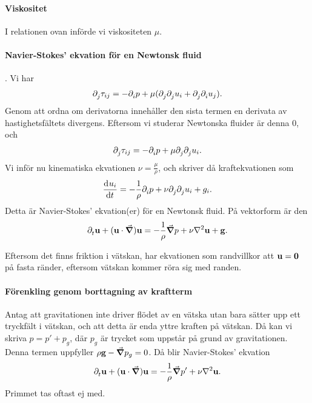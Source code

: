\paragraph{Viskositet}
I relationen ovan införde vi viskositeten $\mu$.

\paragraph{Navier-Stokes' ekvation för en Newtonsk fluid}.
Vi har
\begin{align*}
	\partial_{j}^{}\tau_{ij} = -\partial_{i}^{}p + \mu(\partial_{j}^{}\partial_{j}^{}u_{i} + \partial_{j}^{}\partial_{i}^{}u_{j}).
\end{align*}
Genom att ordna om derivatorna innehåller den sista termen en derivata av hastighetsfältets divergens. Eftersom vi studerar Newtonska fluider är denna $0$, och
\begin{align*}
	\partial_{j}^{}\tau_{ij} = -\partial_{i}^{}p + \mu\partial_{j}^{}\partial_{j}^{}u_{i}.
\end{align*}
Vi inför nu kinematiska ekvationen $\nu = \frac{\mu}{\rho}$, och skriver då kraftekvationen som
\begin{align*}
	\dv[]{u_{i}}{t} = -\frac{1}{\rho}\partial_{i}^{}p + \nu\partial_{j}^{}\partial_{j}^{}u_{i} + g_{i}.
\end{align*}
Detta är Navier-Stokes' ekvation(er) för en Newtonsk fluid. På vektorform är den
\begin{align*}
	\del{t}{\vb{u}} + (\vb{u}\cdot\grad)\vb{u} = -\frac{1}{\rho}\grad{p} + \nu\laplacian{\vb{u}} + \vb{g}.
\end{align*}

Eftersom det finns friktion i vätskan, har ekvationen som randvillkor att $\vb{u} = \vb{0}$ på fasta ränder, eftersom vätskan kommer röra sig med randen.

\paragraph{Förenkling genom borttagning av kraftterm}
Antag att gravitationen inte driver flödet av en vätska utan bara sätter upp ett tryckfält i vätskan, och att detta är enda yttre kraften på vätskan. Då kan vi skriva $p = p' + p_{g}$, där $p_{g}$ är trycket som uppstår på grund av gravitationen. Denna termen uppfyller $\rho\vb{g} - \grad{p_{g}} = 0$. Då blir Navier-Stokes' ekvation
\begin{align*}
	\del{t}{\vb{u}} + (\vb{u}\cdot\grad)\vb{u} = -\frac{1}{\rho}\grad{p'} + \nu\laplacian{\vb{u}}.
\end{align*}
Primmet tas oftast ej med.